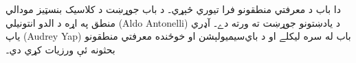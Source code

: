 \documentclass[../../../include/open-logic-chapter]{subfiles}
\begin{document}

\begin{editorial}
  دا باب د معرفتي منطقونو فرا تيوري څېړي۔ د باب جوړښت د کلاسيک
  بنسټيز مودالي منطق په اړه د الدو انتونيلي (Aldo Antonelli) د يادښتونو
  جوړښت ته ورته دے۔ آډري ياپ (Audrey Yap) باب له سره ليکلے او
  د باي‌سيميولېشن او خوځنده معرفتي منطقونو بحثونه ئې ورزيات کړي دي۔
\end{editorial}



\OLEndPartHook
\end{document}
